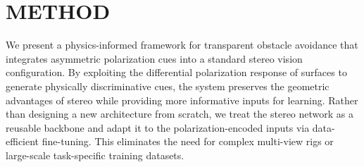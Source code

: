 \documentclass[letterpaper, 10 pt, conference]{ieeeconf}  %
\begin{document}
\section{METHOD}

We present a physics-informed framework for transparent obstacle avoidance that integrates asymmetric polarization cues into a standard stereo vision configuration. By exploiting the differential polarization response of surfaces to generate physically discriminative cues, the system preserves the geometric advantages of stereo while providing more informative inputs for learning. Rather than designing a new architecture from scratch, we treat the stereo network as a reusable backbone and adapt it to the polarization-encoded inputs via data-efficient fine-tuning. This eliminates the need for complex multi-view rigs or large-scale task-specific training datasets.
\end{document}
